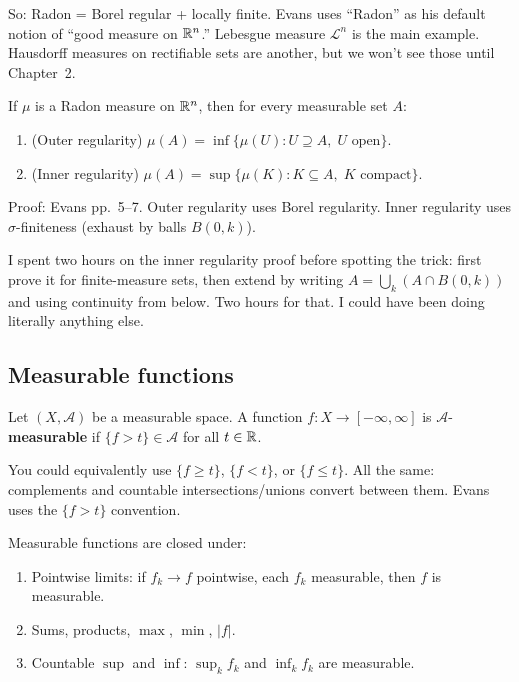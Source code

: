 So: Radon = Borel regular + locally finite. Evans uses
``Radon'' as his default notion of ``good measure on $\mathbb{R}^n$.'' Lebesgue
measure $\mathcal{L}^n$ is the main example. Hausdorff measures on rectifiable sets are another, but we won't see those until Chapter~2.

\begin{proposition}\label{prop:radon-regularity}
If $\mu$ is a Radon measure on $\mathbb{R}^n$, then for every measurable set $A$:
\begin{enumerate}[nosep]
  \item (Outer regularity)
        $\mu(A) = \inf\{\mu(U) : U \supseteq A,\; U \text{ open}\}$.
  \item (Inner regularity)
        $\mu(A) = \sup\{\mu(K) : K \subseteq A,\; K \text{ compact}\}$.
\end{enumerate}
\end{proposition}

Proof: Evans pp.\ 5--7. Outer regularity uses Borel regularity. Inner
regularity uses $\sigma$-finiteness (exhaust by balls $B(0,k)$).

I spent two hours on the inner regularity proof before spotting the trick:
first prove it for finite-measure sets, then extend by writing
$A = \bigcup_k (A \cap B(0,k))$ and using continuity from below. Two hours for that. I could have been doing literally anything else.


\subsection{Measurable functions}\label{subsec:meas-fns}

\begin{definition}\label{def:measurable-fn}
Let $(X, \mathcal{A})$ be a measurable space. A function
$f \colon X \to [-\infty, \infty]$ is $\mathcal{A}$-\textbf{measurable}
if $\{f > t\} \in \mathcal{A}$ for all $t \in \mathbb{R}$.
\end{definition}

You could equivalently use $\{f \ge t\}$, $\{f < t\}$, or $\{f \le t\}$.
All the same: complements and countable intersections/unions convert between them. Evans uses the $\{f > t\}$ convention.

\begin{proposition}\label{prop:measurable-closure}
Measurable functions are closed under:
\begin{enumerate}[nosep]
  \item Pointwise limits: if $f_k \to f$ pointwise, each $f_k$ measurable,
        then $f$ is measurable.
  \item Sums, products, $\max$, $\min$, $|f|$.
  \item Countable $\sup$ and $\inf$: $\sup_k f_k$ and $\inf_k f_k$ are
        measurable.
\end{enumerate}
\end{proposition}


